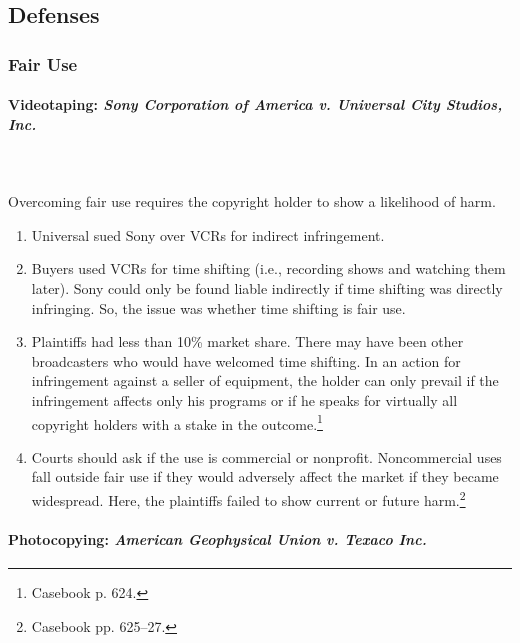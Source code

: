 \subsection{Defenses}


\subsubsection{Fair Use}

\paragraph{Videotaping: \emph{Sony Corporation of America v. Universal City 
Studios, Inc.}}
~\\\\
Overcoming fair use requires the copyright holder to show a likelihood of 
harm.

\begin{enumerate}
    \item Universal sued Sony over VCRs for indirect infringement.
    \item Buyers used VCRs for time shifting (i.e., recording shows and 
    watching them later). Sony could only be found liable indirectly if time 
    shifting was directly infringing. So, the issue was whether time shifting 
    is fair use.
    \item Plaintiffs had less than 10\% market share. There may have been 
    other broadcasters who would have welcomed time shifting. In an action for 
    infringement against a seller of equipment, the holder can only prevail if 
    the infringement affects only his programs or if he speaks for virtually 
    all copyright holders with a stake in the outcome.\footnote{Casebook p. 
    624.}
    \item Courts should ask if the use is commercial or nonprofit. 
    Noncommercial uses fall outside fair use if they would adversely affect 
    the market if they became widespread. Here, the plaintiffs failed to show 
    current or future harm.\footnote{Casebook pp. 625--27.}
\end{enumerate}

\paragraph{Photocopying: \emph{American Geophysical Union v. Texaco Inc.}}

